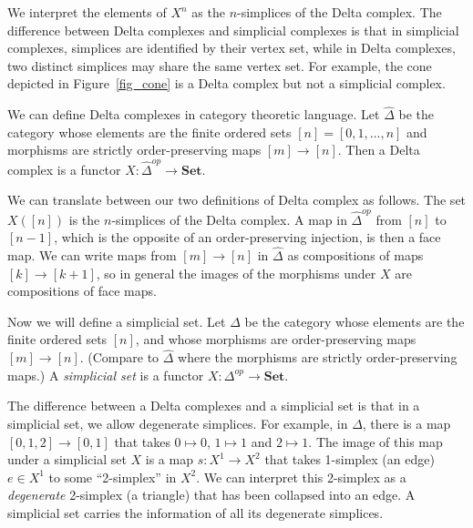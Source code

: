 \documentclass[a4paper,11pt,leqno]{article} \usepackage{amsmath}
\theoremstyle{definition} \newtheorem{defn}{Definition}
\begin{document}
We interpret the elements of $X^n$ as the $n$-simplices of the Delta complex.
The difference between Delta complexes and simplicial complexes is that in
simplicial complexes, simplices are identified by their vertex set, while in
Delta complexes, two distinct simplices may share the same vertex set.  For
example, the cone depicted in Figure~\ref{fig_cone} is a Delta complex but not
a simplicial complex.

We can define Delta complexes in category theoretic language.  Let
$\hat{\Delta}$ be the category whose elements are the finite ordered sets $[n]
= [0,1,\ldots, n]$ and morphisms are strictly order-preserving maps $[m]\to
[n]$.  Then a Delta complex is a functor $X: \hat{\Delta}^{op}\to \textbf{Set}$.

We can translate between our two definitions of Delta complex as follows.  The
set $X([n])$ is the $n$-simplices of the Delta complex.  A map in
$\hat{\Delta}^{op}$ from $[n]$ to $[n-1]$, which is the opposite of an
order-preserving injection, is then a face map.  We can write maps from $[m]\to
[n]$ in $\hat{\Delta}$ as compositions of maps $[k]\to [k+1]$, so in general the
images of the morphisms under $X$ are compositions of face maps.

Now we will define a simplicial set.  Let $\Delta$ be the category whose
elements are the finite ordered sets $[n]$, and whose morphisms are
order-preserving maps $[m]\to [n]$.  (Compare to $\hat{\Delta}$ where the
morphisms are strictly order-preserving maps.) A \emph{simplicial set} is
a functor $X: \Delta^{op}\to \textbf{Set}$.

The difference between a Delta complexes and a simplicial set is that in
a simplicial set, we allow degenerate simplices.  For example, in $\Delta$,
there is a map $[0, 1, 2]\to [0, 1]$ that takes $0\mapsto 0$, $1\mapsto 1$ and
$2\mapsto 1$.  The image of this map under a simplicial set $X$ is a map $s:
X^1\to X^2$ that takes 1-simplex (an edge) $e\in X^1$ to some ``2-simplex'' in
$X^2$.  We can interpret this 2-simplex as a \emph{degenerate} 2-simplex (a
triangle) that has been collapsed into an edge.  A simplicial set carries the
information of all its degenerate simplices.
\end{document}
